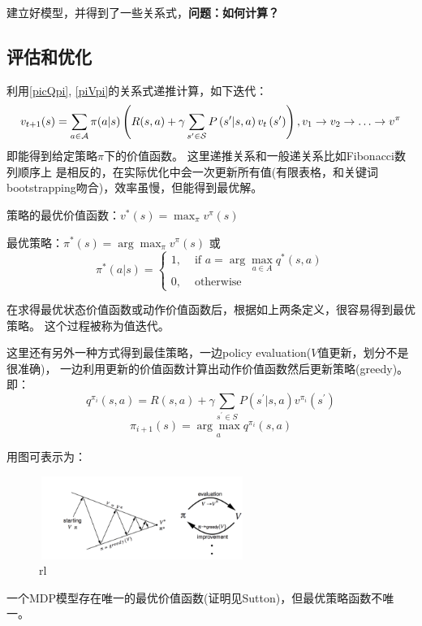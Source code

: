 \documentclass[UTF8]{ctexart}
\begin{document}
建立好模型，并得到了一些关系式，\textbf{问题：如何计算？}

\subsection{评估和优化}

利用\ref{picQpi}, \ref{piVpi}的关系式递推计算，如下迭代：
$$v_{t+1}(s)=\sum_{a \in \mathcal{A}} \pi(a | s)\left(R(s, a)+\gamma \sum_{s^{\prime} 
\in \mathcal{S}} P\left(s^{\prime} | s, a\right) v_{t}\left(s^{\prime}\right)\right),\\
v_{1} \rightarrow v_{2} \rightarrow \ldots \rightarrow v^{\pi}$$
即能得到给定策略$\pi$下的价值函数。
这里递推关系和一般递关系比如Fibonacci数列顺序上
是相反的，在实际优化中会一次更新所有值(有限表格，和关键词bootstrapping吻合)，效率虽慢，但能得到最优解。

策略的最优价值函数：$v^{*}(s)=\max _{\pi} v^{\pi}(s)$

最优策略：$\pi^{*}(s)=\arg \max _{\pi} v^{\pi}(s)$
或
$$\pi^{*}(a | s)=\left\{\begin{array}{ll}
    1, & \text { if } a=\arg \max _{a \in A} q^{*}(s, a) \\
    0, & \text { otherwise }
    \end{array}\right.$$

在求得最优状态价值函数或动作价值函数后，根据如上两条定义，很容易得到最优策略。
这个过程被称为值迭代。

这里还有另外一种方式得到最佳策略，一边policy evaluation($V$值更新，划分不是很准确)，
一边利用更新的价值函数计算出动作价值函数然后更新策略(greedy)。
即：
$$q^{\pi_{i}}(s, a)=R(s, a)+\gamma \sum_{s^{\prime} \in S} P\left(s^{\prime} | s,
a\right) v^{\pi_{i}}\left(s^{\prime}\right)$$
$$\pi_{i+1}(s)=\underset{a}{\arg \max } q^{\pi_{i}}(s, a)$$

用图可表示为：
\begin{figure}[htbp]
	\centering
	\includegraphics[width=6.7cm, height=2.7cm]{./pic/evalimp.png}
	\caption{rl}
\end{figure}

一个MDP模型存在唯一的最优价值函数(证明见Sutton)，但最优策略函数不唯一。
\end{document}
